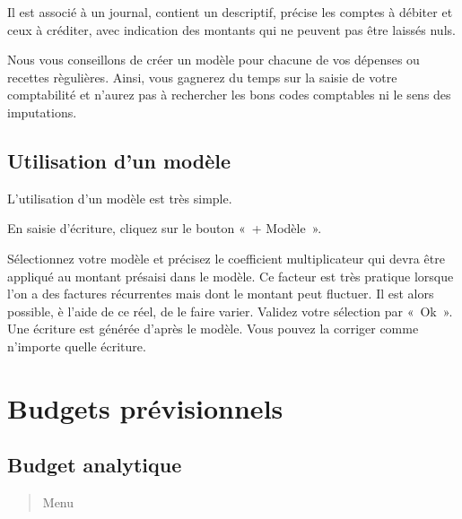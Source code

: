 \documentclass[a4paper,10pt,oneside,french]{sphinxmanual}
\begin{document}
Il est associé à un journal, contient un descriptif, précise les comptes à débiter et ceux à créditer, avec indication des montants qui ne peuvent pas être laissés nuls.
\begin{quote}

\noindent{}
\end{quote}

Nous vous conseillons de créer un modèle pour chacune de vos dépenses ou recettes règulières. Ainsi, vous gagnerez du temps sur la saisie de votre comptabilité et n’aurez pas à rechercher les bons codes comptables ni le sens des imputations.


\subsection{Utilisation d’un modèle}
\label{\detokenize{accounting/model:utilisation-d-un-modele}}
L’utilisation d’un modèle est très simple.

En saisie d’écriture, cliquez sur le bouton « + Modèle ».
\begin{quote}

\noindent{}
\end{quote}

Sélectionnez votre modèle et précisez le coefficient multiplicateur qui devra être appliqué au montant présaisi dans le modèle. Ce facteur est très pratique lorsque l’on a des factures récurrentes mais dont le montant peut fluctuer. Il est alors possible, è l’aide de ce réel, de le faire varier.
Validez votre sélection par « Ok ». Une écriture est générée d’après le modèle. Vous pouvez la corriger comme n’importe quelle écriture.


\section{Budgets prévisionnels}
\label{\detokenize{accounting/budget:budgets-previsionnels}}\label{\detokenize{accounting/budget::doc}}

\subsection{Budget analytique}
\label{\detokenize{accounting/budget:budget-analytique}}\begin{quote}

Menu 
\end{quote}
\end{document}

